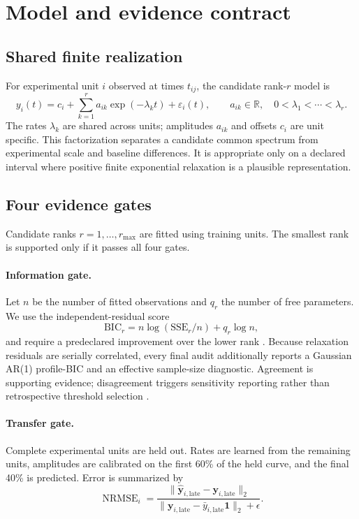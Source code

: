 \documentclass[11pt]{article}
\newcommand{\nrmse}{\operatorname{NRMSE}}
\begin{document}
\section{Model and evidence contract}
\subsection{Shared finite realization}
For experimental unit $i$ observed at times $t_{ij}$, the candidate rank-$r$ model is
\begin{equation}
y_i(t)=c_i+\sum_{k=1}^{r}a_{ik}\exp(-\lambda_k t)+\varepsilon_i(t),
\qquad a_{ik}\in\mathbb R,\quad 0<\lambda_1<\cdots<\lambda_r.
\label{eq:model}
\end{equation}
The rates $\lambda_k$ are shared across units; amplitudes $a_{ik}$ and offsets $c_i$ are unit specific. This factorization separates a candidate common spectrum from experimental scale and baseline differences. It is appropriate only on a declared interval where positive finite exponential relaxation is a plausible representation.

\subsection{Four evidence gates}
Candidate ranks $r=1,\ldots,r_{\max}$ are fitted using training units. The smallest rank is supported only if it passes all four gates.

\paragraph{Information gate.} Let $n$ be the number of fitted observations and $q_r$ the number of free parameters. We use the independent-residual score
\begin{equation}
\mathrm{BIC}_r=n\log(\mathrm{SSE}_r/n)+q_r\log n,
\end{equation}
and require a predeclared improvement over the lower rank \cite{schwarz1978bic}. Because relaxation residuals are serially correlated, every final audit additionally reports a Gaussian AR(1) profile-BIC and an effective sample-size diagnostic. Agreement is supporting evidence; disagreement triggers sensitivity reporting rather than retrospective threshold selection \cite{hurvich1989timeseries}.


\paragraph{Transfer gate.} Complete experimental units are held out. Rates are learned from the remaining units, amplitudes are calibrated on the first 60\% of the held curve, and the final 40\% is predicted. Error is summarized by
\begin{equation}
\nrmse_i=\frac{\|\hat{\mathbf y}_{i,\mathrm{late}}-\mathbf y_{i,\mathrm{late}}\|_2}
{\|\mathbf y_{i,\mathrm{late}}-\bar y_{i,\mathrm{late}}\mathbf 1\|_2+\epsilon}.
\end{equation}
\end{document}
